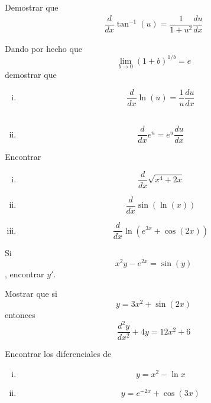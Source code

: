 {}
\begin{problema}

	Demostrar que
	\begin{align*}
		\dfrac{d}{dx}\tan^{-1}\left( u \right) =
		\dfrac{1}{1+u^{2}}\dfrac{du}{dx}
	\end{align*}
\end{problema}


{}
\begin{problema}
	Dando por hecho que \[\lim_{b\to 0}\left( 1+b \right)^{1/b}=e\] demostrar que
	\begin{enumerate}[(i)]
		\item \[\dfrac{d}{dx}\ln(u)=\dfrac{1}{u}\dfrac{du}{dx}\] \\

		\item \[\dfrac{d}{dx}e^{u}= e^{u}\dfrac{du}{dx}\]
	\end{enumerate}
\end{problema}


{}
\begin{problema}
	Encontrar
	\begin{enumerate}[(i)]
		\item \[\dfrac{d}{dx}\sqrt{x^{4}+2x}\]

		\item \[\dfrac{d}{dx}\sin\left( \ln(x) \right)\]

		\item \[\dfrac{d}{dx}\ln\left( e^{3x}+ \cos\left( 2x \right) \right)\]
	\end{enumerate}
\end{problema}



\begin{problema}
	Si \[x^{2}y-e^{2x}=\sin(y)\], encontrar $y'$.
\end{problema}


\begin{problema}
	Mostrar que si \[y=3x^{2}+\sin(2x)\] entonces
	\[\dfrac{d^{2}y}{dx^{2}}+4y=12x^{2}+6\]
\end{problema}


{}
\begin{problema}
	Encontrar los diferenciales de
	\begin{enumerate}[(i)]
		\item \[y=x^{2}-\ln x\]

		\item \[y = e^{-2x}+\cos(3x)\]
	\end{enumerate}
\end{problema}



